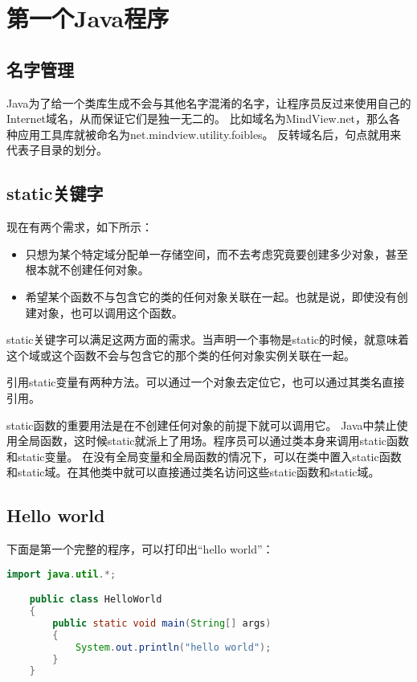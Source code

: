 \documentclass[a4paper,left=2.5cm,right=2.5cm,11pt]{article}
\begin{document}
\tableofcontents

\clearpage

\section{第一个Java程序}
\subsection{名字管理}
	Java为了给一个类库生成不会与其他名字混淆的名字，让程序员反过来使用自己的Internet域名，从而保证它们是独一无二的。
	比如域名为MindView.net，那么各种应用工具库就被命名为net.mindview.utility.foibles。
	反转域名后，句点就用来代表子目录的划分。\par
\subsection{static关键字}
	现在有两个需求，如下所示：
	\begin{itemize}
		\item 只想为某个特定域分配单一存储空间，而不去考虑究竟要创建多少对象，甚至根本就不创建任何对象。
		\item 希望某个函数不与包含它的类的任何对象关联在一起。也就是说，即使没有创建对象，也可以调用这个函数。
	\end{itemize}

	static关键字可以满足这两方面的需求。当声明一个事物是static的时候，就意味着这个域或这个函数不会与包含它的那个类的任何对象实例关联在一起。\par
	引用static变量有两种方法。可以通过一个对象去定位它，也可以通过其类名直接引用。\par
	static函数的重要用法是在不创建任何对象的前提下就可以调用它。
	Java中禁止使用全局函数，这时候static就派上了用场。程序员可以通过类本身来调用static函数和static变量。
	在没有全局变量和全局函数的情况下，可以在类中置入static函数和static域。在其他类中就可以直接通过类名访问这些static函数和static域。

\subsection{Hello world}
	下面是第一个完整的程序，可以打印出“hello world”：
	\begin{lstlisting}[language = Java]
	import java.util.*;

	public class HelloWorld
	{
		public static void main(String[] args)
		{
			System.out.println("hello world");
		}
	}
	\end{lstlisting}
\end{document}
